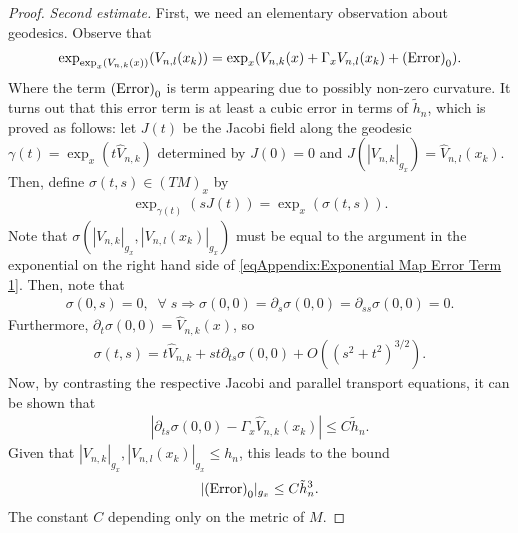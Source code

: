 \documentclass[11pt,reqno]{amsart}
\numberwithin{equation}{section}
\theoremstyle{plain}
\begin{document}
\begin{proof}
  \noindent \emph{Second estimate.} First, we need an elementary observation about geodesics. Observe that
  \begin{align}\label{eqAppendix:Exponential Map Error Term 1}
    \exp_{\exp_x(V_{n,k}(x))}(V_{n,l}(x_k)) = \exp_{x}(V_{n,k}(x)+\Gamma_xV_{n,l}(x_k)+ \textnormal{(Error)}_0).
  \end{align}
  Where the term $\textnormal{(Error)}_0$ is term appearing due to possibly non-zero curvature. It turns out that this error term is at least a cubic error in terms of $\tilde h_n$, which is proved as follows: let $J(t)$ be the Jacobi field along the geodesic $\gamma(t) = \exp_x(t \hat V_{n,k})$ determined by $J(0)=0$ and $J(|V_{n,k}|_{g_x}) = \hat V_{n,l}(x_k)$. Then,  define $\sigma(t,s) \in (TM)_x $ by
  \begin{align*}
    \exp_{\gamma(t)}(s J(t) )  = \exp_{x}( \sigma(t,s)).
  \end{align*}
  Note that $\sigma\left ( |V_{n,k}|_{g_x},|V_{n,l}(x_k)|_{g_x} \right )$ must be equal to the argument in the exponential on the right hand side of \eqref{eqAppendix:Exponential Map Error Term 1}. Then, note that
  \begin{align*}
    \sigma(0,s) = 0,\;\;\forall\;s \Rightarrow \sigma(0,0)= \partial_{s}\sigma(0,0) =\partial_{ss}\sigma(0,0)=0.
  \end{align*}
  Furthermore, $\partial_t \sigma(0,0) = \hat V_{n,k}(x)$, so
  \begin{align*}
    \sigma(t,s) = t\hat V_{n,k}+st \partial_{ts}\sigma(0,0) + O((s^2+t^2)^{3/2}).
  \end{align*}
  Now, by contrasting the respective Jacobi and parallel transport equations, it can be shown that
  \begin{align*}
    |\partial_{ts}\sigma(0,0)-\Gamma_x \hat V_{n,k}(x_k)|\leq C\tilde h_n.
  \end{align*}
  Given that $|V_{n,k}|_{g_x},|V_{n,l}(x_k)|_{g_x}\leq h_n$, this leads to the bound
  \begin{align}\label{eqAppendix:Exponential Map Error Term 2}
    | \textnormal{(Error)}_0|_{g_x} \leq C\tilde h_n^3.
  \end{align}	  
  The constant $C$ depending only on the metric of $M$. 
  

\end{proof}
\end{document}
